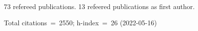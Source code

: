 73 refereed publications. 13 refeered publications as first author.

Total citations~=~2550; h-index~=~26 (2022-05-16)